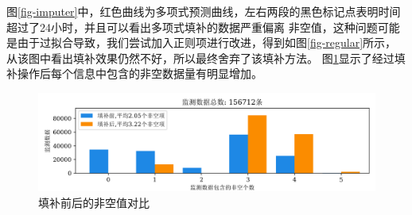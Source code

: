 \documentclass[12pt, a4paper, oneside]{ctexart}
\numberwithin{equation}{section}  %
\begin{document}
图\ref{fig-imputer}中，红色曲线为多项式预测曲线，左右两段的黑色标记点表明时间超过了24小时，并且可以看出多项式填补的数据严重偏离
非空值，这种问题可能是由于过拟合导致，我们尝试加入正则项进行改进，得到如图\ref{fig-regular}所示，
从该图中看出填补效果仍然不好，所以最终舍弃了该填补方法。
图\ref{fig-imputer-null-compare}显示了经过填补操作后每个信息中包含的非空数据量有明显增加。
\begin{figure}[htbp]
    \vspace{-1em}
    \hspace{-1.4cm}
    \includegraphics[scale=0.21]{before_vs_after_impute_null_data_number_plot}
    \caption{填补前后的非空值对比}
    \label{fig-imputer-null-compare}
\end{figure}
\end{document}
